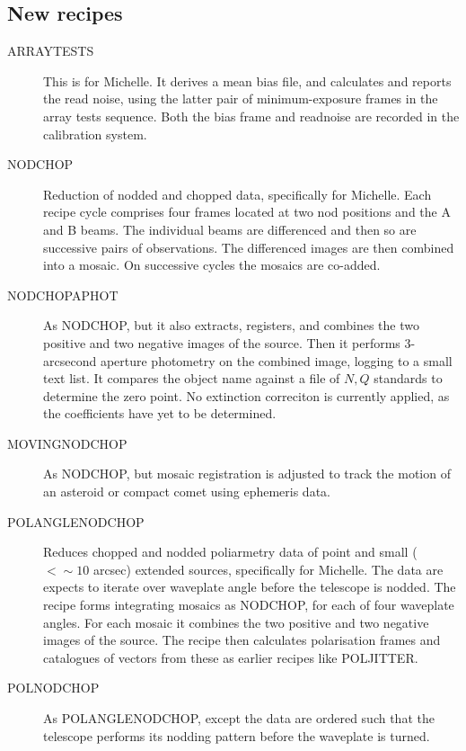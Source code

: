 \documentclass[twoside,11pt]{article}
\newcommand{\htmlref}[2]{#1}
\renewcommand{\_}{\texttt{\symbol{95}}}
\begin{document}
\subsection{New recipes}
\begin{description}
   \item [ARRAY\_TESTS]
      This is for Michelle.  It derives a mean bias file, and
      calculates and reports the read noise, using the latter pair of
      minimum-exposure frames in the array tests sequence.  Both the
      bias frame and readnoise are recorded in the calibration system.
   \item [\htmlref{NOD\_CHOP}{NOD\_CHOP}]
      Reduction of nodded and chopped data, specifically for Michelle.
      Each recipe cycle comprises four frames located at two nod
      positions and the A and B beams.  The individual beams are
      differenced and then so are successive pairs of observations.
      The differenced images are then combined into a mosaic.  On
      successive cycles the mosaics are co-added.
   \item [\htmlref{NOD\_CHOP\_APHOT}{NOD\_CHOP\_APHOT}]
      As \htmlref{NOD\_CHOP}{NOD\_CHOP}, but it also extracts, registers,
      and combines the two positive and two negative images of the
      source. Then it performs 3-arcsecond aperture photometry on the
      combined image, logging to a small text list.  It compares the
      object name against a file of $N,Q$ standards to determine the
      zero point.  No extinction correciton is currently applied, as
      the coefficients have yet to be determined.
   \item [\htmlref{MOVING\_NOD\_CHOP}{MOVING\_NOD\_CHOP}]
      As \htmlref{NOD\_CHOP}{NOD\_CHOP}, but mosaic registration
      is adjusted to track the motion of an asteroid or compact comet
      using ephemeris data. 
   \item [\htmlref{POL\_ANGLE\_NOD\_CHOP}{POL\_ANGLE\_NOD\_CHOP}]
      Reduces chopped and nodded poliarmetry data of point and small
      ($<\sim10$ arcsec) extended sources, specifically for Michelle.
      The data are expects to iterate over waveplate angle before the
      telescope is nodded.  The recipe forms integrating mosaics as
      \htmlref{NOD\_CHOP}{NOD\_CHOP}, for each of four waveplate
      angles.  For each mosaic it combines the two positive and two
      negative images of the source.  The recipe then calculates
      polarisation frames and catalogues of vectors from these as
      earlier recipes like \htmlref{POL\_JITTER}{POL\_JITTER}.
    \item [\htmlref{POL\_NOD\_CHOP}{POL\_NOD\_CHOP}]
      As \htmlref{POL\_ANGLE\_NOD\_CHOP}{POL\_ANGLE\_NOD\_CHOP},
      except the data are ordered such that the telescope performs
      its nodding pattern before the waveplate is turned.
\end{description}
\end{document}

